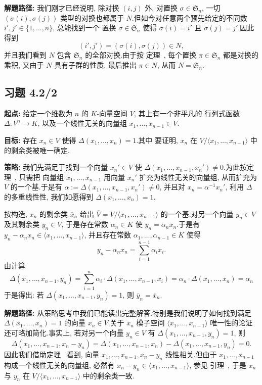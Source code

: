 \noindent\textbf{解题路径:} 我们刚才已经说明, 除对换 $(i, j)$ 外, 对置换
$\sigma \in \mathfrak{S}_n$, 一切 $(\sigma(i), \sigma(j))$ 类型的对换也都属于
$N$.但如今对任意两个预先给定的不同数 $i', j' \in \{1, \ldots, n\}$, 总能找到一个
置换 $\sigma \in \mathfrak{S}_n$ 使得 $\sigma(i) = i'$ 且 $\sigma(j) = j'$.因此
得到
\[
(i', j') = (\sigma(i), \sigma(j)) \in N,
\]
并且我们看到 $N$ 包含 $\mathfrak{S}_n$ 的全部对换.由于按
定理~, 每个置换 $\pi \in \mathfrak{S}_n$ 都是对换的乘积, 又由于 $N$
具有子群的性质, 最后推出 $\pi \in N$, 从而 $N = \mathfrak{S}_n$.

\subsection*{习题 4.2/2}

\noindent\textbf{起点:} 给定一个维数为 $n$ 的 $K$-向量空间 $V$, 其上有一个非平凡的
行列式函数 $\varDelta \colon V^n \longrightarrow K$, 以及一个线性无关的向量组
$x_1, \ldots, x_{n-1} \in V$.

\noindent\textbf{目标:} 存在 $x_n \in V$ 使得 $\varDelta(x_1, \ldots, x_n) = 1$.其中
要证明, $x_n$ 在 $V/\langle x_1, \ldots, x_{n-1}\rangle$ 中的剩余类被唯一确定.

\noindent\textbf{策略:} 我们先满足于找到一个向量 $x_n' \in V$ 使
$\varDelta(x_1, \ldots, x_{n-1}, x_n') \neq 0$.为此按定理~, 只需把
向量组 $x_1, \ldots, x_{n-1}$ 用向量 $x_n'$ 扩充为线性无关的向量组, 从而扩充为 $V$
的一个基.于是有 $\alpha := \varDelta(x_1, \ldots, x_{n-1}, x_n') \neq 0$, 并且对
$x_n = \alpha^{-1} x_n'$, 利用 $\varDelta$ 的多重线性性, 我们如愿得到
$\varDelta(x_1, \ldots, x_n) = 1$.

按构造, $x_n$ 的剩余类 $\overline{x}_n$ 给出 $\overline{V} = V/\langle x_1, \ldots,
x_{n-1}\rangle$ 的一个基.对另一个向量 $y_n \in V$ 及其剩余类
$\overline{y}_n \in \overline{V}$, 于是存在常数 $\alpha_n \in K$ 使
$\overline{y}_n = \alpha_n \overline{x}_n$.于是有 $y_n - \alpha_n x_n \in
\langle x_1, \ldots, x_{n-1}\rangle$, 并且存在常数 $\alpha_1, \ldots, \alpha_{n-1}
\in K$ 使得
\[
y_n - \alpha_n x_n = \sum_{i=1}^{n-1} \alpha_i x_i\text{.}
\]
由计算
\[
\varDelta(x_1, \ldots, x_{n-1}, y_n) = \sum_{i=1}^{n} \alpha_i \cdot \varDelta(x_1,
\ldots, x_{n-1}, x_i) = \alpha_n \cdot \varDelta(x_1, \ldots, x_n) = \alpha_n
\]
于是得出: 若 $\varDelta(x_1, \ldots, x_{n-1}, y_n) = 1$, 则
$\overline{y}_n = \overline{x}_n$.

\noindent\textbf{解题路径:} 从策略思考中我们已能读出完整解答.特别是我们说明了如何找到满足 $\varDelta(x_1, \ldots, x_n) = 1$ 的向量 $x_n \in V$.关于 $x_n$ 模子空间 $\langle x_1, \ldots, x_{n-1}\rangle$ 唯一性的论证还可略加简化.事实上, 若对另一个向量 $y_n \in V$ 有 $\varDelta(x_1, \ldots, x_{n-1}, y_n) = 1$, 则
\[
\varDelta(x_1, \ldots, x_{n-1}, x_n - y_n) = \varDelta(x_1, \ldots, x_{n-1}, x_n)
- \varDelta(x_1, \ldots, x_{n-1}, y_n) = 0\text{.}
\]
因此我们借助定理~ 看到, 向量 $x_1, \ldots, x_{n-1}, x_n - y_n$
线性相关.但由于 $x_1, \ldots, x_{n-1}$ 构成一个线性无关的向量组, 必然有
$x_n - y_n \in \langle x_1, \ldots, x_{n-1}\rangle$, 参见
引理~, 于是 $x_n$ 与 $y_n$ 在 $V/\langle x_1, \ldots,
x_{n-1}\rangle$ 中的剩余类一致.

